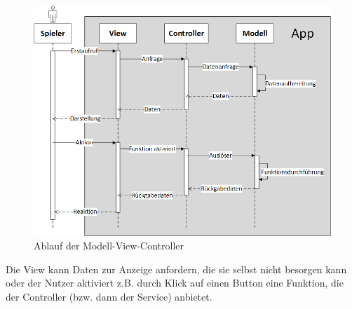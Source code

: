 \begin{figure}[h]
\centering
\includegraphics[width=1\textwidth]{ref/images/mvc-ablauf.png}
\caption[Ablauf der Modell-View-Controller]{Ablauf der Modell-View-Controller}
\label{fig:MVC-Ablauf}
\end{figure} 

Die View kann Daten zur Anzeige anfordern, die sie selbst nicht besorgen kann oder der Nutzer aktiviert z.B. durch Klick auf einen Button eine Funktion, die der Controller (bzw. dann der Service) anbietet.